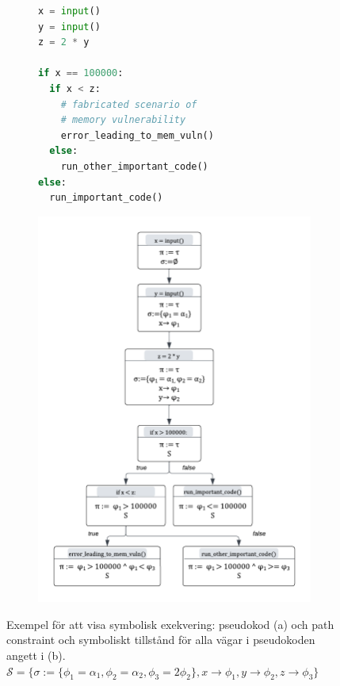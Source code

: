 \begin{figure}[H]
    \begin{subfigure}[b]{0.58\textwidth}
        \begin{lstlisting}[language=Python, frame=single,
        basicstyle=\normalfont\ttfamily]
x = input()
y = input()
z = 2 * y

if x == 100000:
  if x < z:
    # fabricated scenario of
    # memory vulnerability
    error_leading_to_mem_vuln()
  else:
    run_other_important_code()
else:
  run_important_code()
\end{lstlisting}
        \caption{} %
        \label{fig:symbex_example_code}
    \end{subfigure}
    \begin{subfigure}[t]{0.4\textwidth}
        \centering
        \includegraphics[scale=0.31]{figures/final_symbolic_example_graph.png}
        \caption{} %
        \label{fig:symbex_example_graph}
    \end{subfigure}

    \caption{Exempel för att visa symbolisk exekvering: pseudokod (a) och path
        constraint och symboliskt tillstånd för alla vägar i pseudokoden angett
        i (b). $  \mathcal{S} = \{\sigma := \{\phi_1 = \alpha_1, \phi_2 = \alpha_2, \phi_3 =
            2\phi_2\}, x \rightarrow \phi_1, y \rightarrow \phi_2, z \rightarrow
            \phi_3\}$}
\end{figure}

